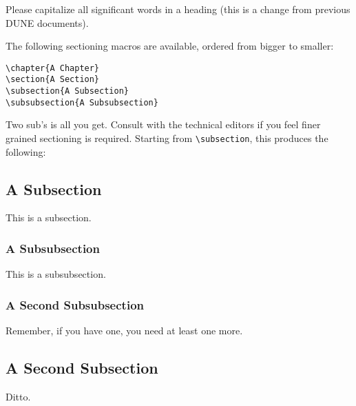 Please capitalize all significant words in a heading (this is a change from 
previous DUNE documents).

The following sectioning macros are available, ordered from bigger to smaller:

\begin{verbatim}
\chapter{A Chapter}
\section{A Section}
\subsection{A Subsection}
\subsubsection{A Subsubsection}
\end{verbatim}

Two sub's is all you get.  
Consult with the technical editors if you feel finer grained
sectioning is required.
Starting from \verb|\subsection|, this produces the following:

\subsection{A Subsection}
\label{sec:latex-sec-sub}

This is a subsection.

\subsubsection{A Subsubsection}
\label{sec:latex-sec-subsub}

This is a subsubsection.

\subsubsection{A Second Subsubsection}
\label{sec:latex-sec-subsub2}

Remember, if you have one, you need at least one more.

\subsection{A Second Subsection}
\label{sec:latex-sub2}

Ditto.
